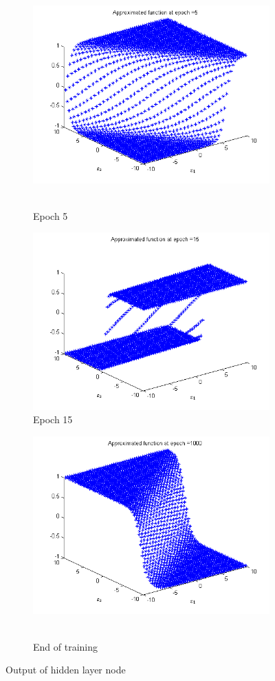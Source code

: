 \begin{figure}
  \begin{subfigure}{.5\textwidth}
  \centering
  \includegraphics[width=.8\linewidth]{Regression/bivariate/hidden_1layer_5.png}\
  \caption{Epoch 5}
\end{subfigure}%
\begin{subfigure}{.5\textwidth}
  \centering
  \includegraphics[width=.8\linewidth]{Regression/bivariate/hidden_1layer_15.png}
   \caption{Epoch 15}
  \end{subfigure}
  
  \begin{subfigure}{.5\textwidth}
  \centering
  \includegraphics[width=.8\linewidth]{Regression/bivariate/hidden_1layer_1000.png}\
  \caption{End of training}
\end{subfigure}%
  
\caption{Output of hidden layer node}
\end{figure}
